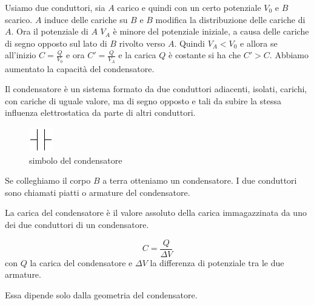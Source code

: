 Usiamo due conduttori, sia $A$ carico e quindi con un certo potenziale $V_0$ e $B$ scarico. $A$ induce delle cariche su $B$ e $B$ modifica la distribuzione delle cariche di $A$. Ora il potenziale di $A$ $V_A$ è minore del potenziale iniziale, a causa delle cariche di segno opposto sul lato di $B$ rivolto verso $A$. Quindi $V_A<V_0$ e allora se all'inizio $C=\frac{Q}{V_0}$ e ora $C'=\frac{Q}{V_A}$ e la carica $Q$ è costante si ha che $C'>C$. Abbiamo aumentato la capacità del condensatore.
\begin{Def}[condensatore]
Il condensatore è un sistema formato da due conduttori adiacenti, isolati, carichi, con cariche di uguale valore, ma di segno opposto e tali da subire la stessa influenza elettrostatica da parte di altri conduttori.
\end{Def}
\begin{figure}[htbp]
\centering
\includegraphics[scale=1.5]{immagini/fisica2/cond1}
\caption{simbolo del condensatore}
\end{figure}
Se colleghiamo il corpo $B$ a terra otteniamo un condensatore. I due conduttori sono chiamati piatti o armature del condensatore.
\begin{Def}
La carica del condensatore è il valore assoluto della carica immagazzinata da uno dei due conduttori di un condensatore.
\end{Def}
\begin{Def}
\begin{equation*}C=\frac{Q}{\Delta V}\end{equation*}
con $Q$ la carica del condensatore e $\Delta V$ la differenza di potenziale tra le due armature.
\end{Def}
Essa dipende solo dalla geometria del condensatore.
